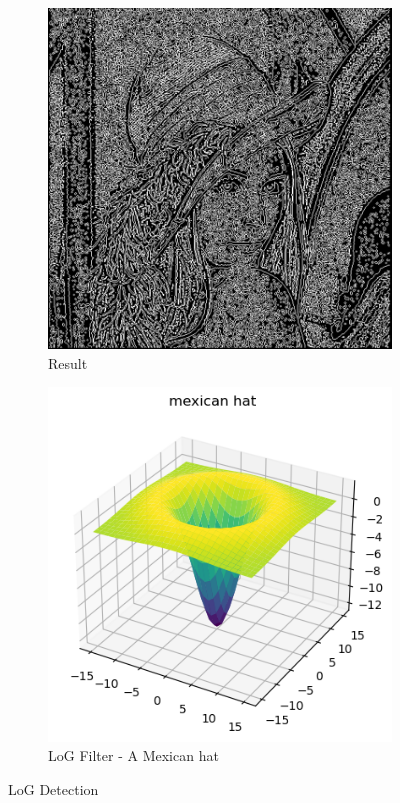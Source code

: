 \documentclass{article}
\begin{document}
    \begin{figure}[ht!]
        \centering
        \begin{subfigure}[b]{0.4\linewidth}
        \includegraphics[width = \linewidth]{fig7a.png}
        \caption{Result}
        
        \end{subfigure}
        \begin{subfigure}[b]{0.4\linewidth}
        \includegraphics[width = \linewidth]{fig7b.png}
        \caption{LoG Filter - 
A Mexican hat}
        
        \end{subfigure}
        
        \caption{LoG Detection}
        \label{fig8}
    \end{figure}
\end{document}
